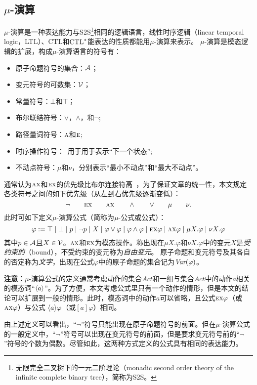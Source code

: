 \subsection{$\mu$-演算}
$\mu$-演算是一种表达能力与S2S\footnote{无限完全二叉树下的一元二阶理论（monadic second order theory of the infinite complete binary tree），简称为S2S。}相同的逻辑语言，线性时序逻辑（linear temporal  logic，LTL）、CTL和$\textrm{CTL}^*$能表达的性质都能用$\mu$-演算来表示。
$\mu$-演算是模态逻辑的扩展，构成$\mu$-演算语言的符号有：
\begin{itemize}
	\item 原子命题符号的集合：$\cal A$；
	\item 变元符号的可数集：$\cal V$；
	\item 常量符号：$\bot$和$\top$；
	\item 布尔联结符号：$\vee$，$\wedge$，和$\neg$;
	\item 路径量词符号：$\textsc{a}$和$\textsc{e}$;
	\item 时序操作符号：\NEXT\ 用于用于表示“下一个状态”;
	\item 不动点符号：$\mu$和$\nu$，分别表示“最小不动点”和“最大不动点”。
\end{itemize}

通常认为$\textsc{a}\textsc{x}$和$\textsc{e}\textsc{x}$的优先级比布尔连接符高~\cite{bradfield2018mu}，为了保证文章的统一性，本文规定各类符号之间的如下优先级（从左到右优先级逐渐变低）：
\[
\neg\qquad \textsc{e}\textsc{x}\qquad \textsc{a}\textsc{x}\qquad \wedge\qquad \vee\qquad \mu\qquad \nu.
\]
此时可如下定义$\mu$-演算公式（简称为$\mu$-公式或公式）：
\[
\varphi := \top \mid \bot \mid p\mid \neg p\mid  X\mid \varphi \vee \varphi \mid \varphi \wedge \varphi \mid \textsc{e}\textsc{x} \varphi\mid \textsc{a}\textsc{x} \varphi \mid \mu X. \varphi\mid \nu X. \varphi
\]
其中$p\in {\cal A}$且$X\in {\cal V}$。$\textsc{a}\textsc{x}$和$\textsc{e}\textsc{x}$为模态操作。称出现在$\mu X. \varphi$和$\nu X. \varphi$中的变元$X$是\emph{受约束的}（bound），不受约束的变元称为\emph{自由变元}。
原子命题和变元符号及其各自的否定称为\emph{文字}，出现在公式$\varphi$中的原子命题的集合记为$\textit{Var}(\varphi)$。

\textbf{注意：}$\mu$-演算公式的定义通常考虑动作的集合$Act$和一组与集合$Act$中的动作$a$相关的模态词“${\langle{a}\rangle}$”\cite{DBLP:journals/cacm/Kozen83,d1996uniform,d2000logical}。为了方便，本文考虑公式里只有一个动作的情形，但是本文的结论可以扩展到一般的情形。此时，模态词中的动作$a$可以省略，且公式$\textsc{e}\textsc{x}\varphi$（或$\textsc{a}\textsc{x} \varphi$）与公式 ${\langle{a}\rangle}\varphi$（或$[a]\varphi$）\cite{d2000logical}相同。

由上述定义可以看出，“$\neg$”符号只能出现在原子命题符号的前面。但在$\mu$-演算公式的一般定义中，“$\neg$”符号可以出现在变元符号的前面，但是要求变元符号前的“$\neg$”符号的个数为偶数。尽管如此，这两种方式定义的公式具有相同的表达能力。

